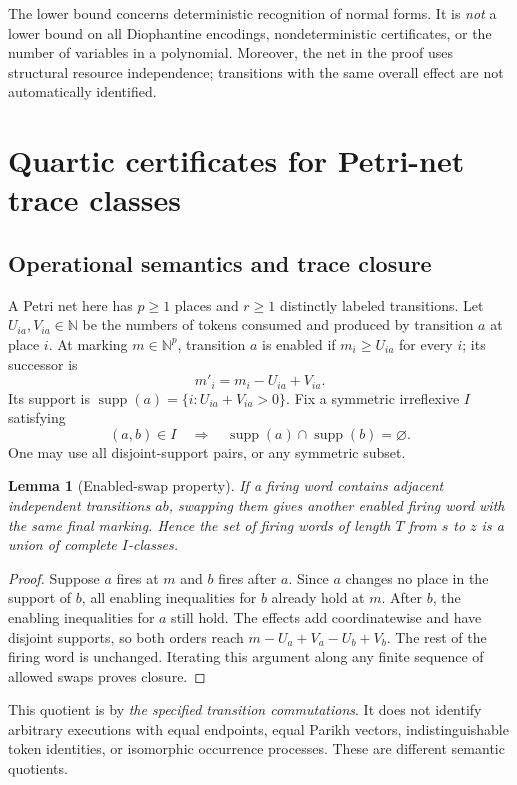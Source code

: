 \documentclass[11pt,a4paper]{article}
\newtheorem{lemma}[lemma]{Lemma}
\theoremstyle{definition}
\theoremstyle{remark}
\newcommand{\N}{\mathbb N}
\newcommand{\supp}{\operatorname{supp}}
\newcommand{\srctag}[1]{\texorpdfstring{\hspace{0.5em}{\normalfont\small\color{accent}[#1]}}{ [#1]}}
\begin{document}
The lower bound concerns deterministic recognition of normal forms. It is \emph{not} a lower bound on all Diophantine encodings, nondeterministic certificates, or the number of variables in a polynomial. Moreover, the net in the proof uses structural resource independence; transitions with the same overall effect are not automatically identified.

\section{Quartic certificates for Petri-net trace classes\srctag{04}}
\subsection{Operational semantics and trace closure}
A Petri net here has $p\geq1$ places and $r\geq1$ distinctly labeled transitions. Let $U_{ia},V_{ia}\in\N$ be the numbers of tokens consumed and produced by transition $a$ at place $i$. At marking $m\in\N^p$, transition $a$ is enabled if $m_i\geq U_{ia}$ for every $i$; its successor is
\[
 m'_i=m_i-U_{ia}+V_{ia}.
\]
Its support is $\supp(a)=\{i:U_{ia}+V_{ia}>0\}$. Fix a symmetric irreflexive $I$ satisfying
\begin{equation}\label{cdc:wf:eq:disjoint}
 (a,b)\in I\quad\Longrightarrow\quad
 \supp(a)\cap\supp(b)=\varnothing.
\end{equation}
One may use all disjoint-support pairs, or any symmetric subset.

\begin{lemma}[Enabled-swap property]\label{cdc:wf:lem:swap}
If a firing word contains adjacent independent transitions $ab$, swapping them gives another enabled firing word with the same final marking. Hence the set of firing words of length $T$ from $s$ to $z$ is a union of complete $I$-classes.
\end{lemma}
\begin{proof}
Suppose $a$ fires at $m$ and $b$ fires after $a$. Since $a$ changes no place in the support of $b$, all enabling inequalities for $b$ already hold at $m$. After $b$, the enabling inequalities for $a$ still hold. The effects add coordinatewise and have disjoint supports, so both orders reach $m-U_a+V_a-U_b+V_b$. The rest of the firing word is unchanged. Iterating this argument along any finite sequence of allowed swaps proves closure.
\end{proof}

This quotient is by \emph{the specified transition commutations}. It does not identify arbitrary executions with equal endpoints, equal Parikh vectors, indistinguishable token identities, or isomorphic occurrence processes. These are different semantic quotients.
\end{document}
